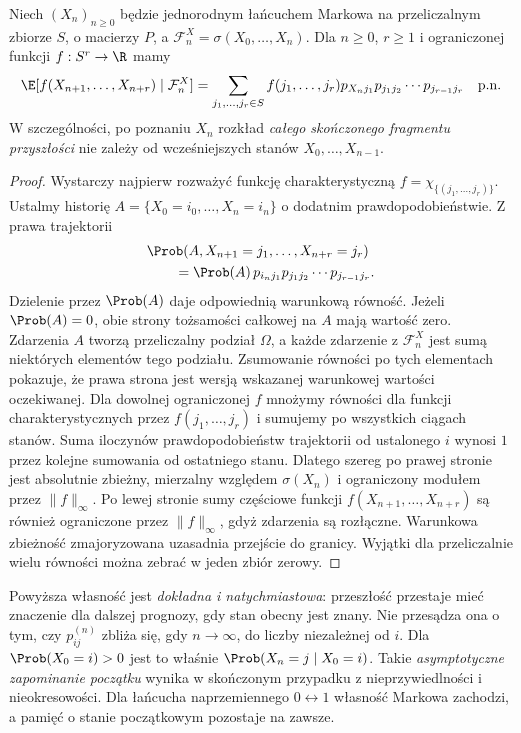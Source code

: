 \begin{twierdzenie}
Niech $(X_n)_{n\geq0}$ będzie jednorodnym łańcuchem
Markowa na przeliczalnym zbiorze $S$, o macierzy $P$,
a $\mathcal F_n^X=\sigma(X_0,\ldots,X_n)$. Dla
$n\geq0$, $r\geq1$ i ograniczonej funkcji
$f:S^r\to\R$ mamy
\[
\E[f(X_{n+1},\ldots,X_{n+r})\mid\mathcal F_n^X]
=\sum_{j_1,\ldots,j_r\in S} f(j_1,\ldots,j_r)
 p_{X_nj_1}p_{j_1j_2}\cdots p_{j_{r-1}j_r}
\quad\text{p.n.}
\]
W szczególności, po poznaniu $X_n$ rozkład
\emph{całego skończonego fragmentu przyszłości}
nie zależy od wcześniejszych stanów $X_0,\ldots,X_{n-1}$.
\end{twierdzenie}
\begin{proof}
Wystarczy najpierw rozważyć funkcję charakterystyczną
$f=\chi_{\{(j_1,\ldots,j_r)\}}$. Ustalmy historię
$A=\{X_0=i_0,\ldots,X_n=i_n\}$ o dodatnim
prawdopodobieństwie. Z prawa trajektorii
\begin{align*}
&\Prob(A, X_{n+1}=j_1,\ldots,X_{n+r}=j_r)\\
&\qquad=\Prob(A)\,p_{i_nj_1}p_{j_1j_2}\cdots
p_{j_{r-1}j_r}.
\end{align*}
Dzielenie przez $\Prob(A)$ daje odpowiednią
warunkową równość. Jeżeli $\Prob(A)=0$, obie
strony tożsamości całkowej na $A$ mają wartość zero.
Zdarzenia $A$ tworzą przeliczalny podział $\Omega$,
a każde zdarzenie z $\mathcal F_n^X$ jest sumą
niektórych elementów tego podziału. Zsumowanie
równości po tych elementach pokazuje, że prawa
strona jest wersją wskazanej warunkowej wartości
oczekiwanej. Dla dowolnej ograniczonej $f$ mnożymy
równości dla funkcji charakterystycznych przez
$f(j_1,\ldots,j_r)$ i sumujemy po wszystkich ciągach
stanów. Suma iloczynów prawdopodobieństw
trajektorii od ustalonego $i$ wynosi $1$ przez
kolejne sumowania od ostatniego stanu.
Dlatego szereg po prawej stronie jest absolutnie
zbieżny, mierzalny względem $\sigma(X_n)$
i ograniczony modułem przez $\|f\|_\infty$.
Po lewej stronie sumy częściowe funkcji
$f(X_{n+1},\ldots,X_{n+r})$ są również ograniczone
przez $\|f\|_\infty$, gdyż zdarzenia są rozłączne.
Warunkowa zbieżność zmajoryzowana uzasadnia
przejście do granicy. Wyjątki dla przeliczalnie
wielu równości można zebrać w jeden zbiór zerowy.
\end{proof}

\begin{uwaga}
Powyższa własność jest \emph{dokładna i natychmiastowa}:
przeszłość przestaje mieć znaczenie dla dalszej prognozy,
gdy stan obecny jest znany. Nie przesądza ona o tym,
czy $p_{ij}^{(n)}$ zbliża się, gdy
$n\to\infty$, do liczby niezależnej od $i$.
Dla $\Prob(X_0=i)>0$ jest to właśnie
$\Prob(X_n=j\mid X_0=i)$.
Takie \emph{asymptotyczne zapominanie początku}
wynika w skończonym przypadku z nieprzywiedlności
i nieokresowości. Dla łańcucha naprzemiennego
$0\leftrightarrow1$ własność Markowa zachodzi,
a pamięć o stanie początkowym pozostaje na zawsze.
\end{uwaga}

